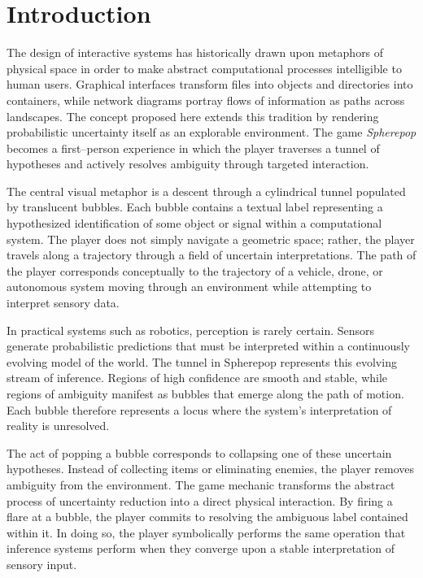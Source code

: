 \documentclass[11pt]{article}
\begin{document}
\newpage
\section{Introduction}

The design of interactive systems has historically drawn upon metaphors of physical space in order to make abstract computational processes intelligible to human users. Graphical interfaces transform files into objects and directories into containers, while network diagrams portray flows of information as paths across landscapes. The concept proposed here extends this tradition by rendering probabilistic uncertainty itself as an explorable environment. The game \emph{Spherepop} becomes a first--person experience in which the player traverses a tunnel of hypotheses and actively resolves ambiguity through targeted interaction.

The central visual metaphor is a descent through a cylindrical tunnel populated by translucent bubbles. Each bubble contains a textual label representing a hypothesized identification of some object or signal within a computational system. The player does not simply navigate a geometric space; rather, the player travels along a trajectory through a field of uncertain interpretations. The path of the player corresponds conceptually to the trajectory of a vehicle, drone, or autonomous system moving through an environment while attempting to interpret sensory data.

In practical systems such as robotics, perception is rarely certain. Sensors generate probabilistic predictions that must be interpreted within a continuously evolving model of the world. The tunnel in Spherepop represents this evolving stream of inference. Regions of high confidence are smooth and stable, while regions of ambiguity manifest as bubbles that emerge along the path of motion. Each bubble therefore represents a locus where the system's interpretation of reality is unresolved.

The act of popping a bubble corresponds to collapsing one of these uncertain hypotheses. Instead of collecting items or eliminating enemies, the player removes ambiguity from the environment. The game mechanic transforms the abstract process of uncertainty reduction into a direct physical interaction. By firing a flare at a bubble, the player commits to resolving the ambiguous label contained within it. In doing so, the player symbolically performs the same operation that inference systems perform when they converge upon a stable interpretation of sensory input.
\end{document}
